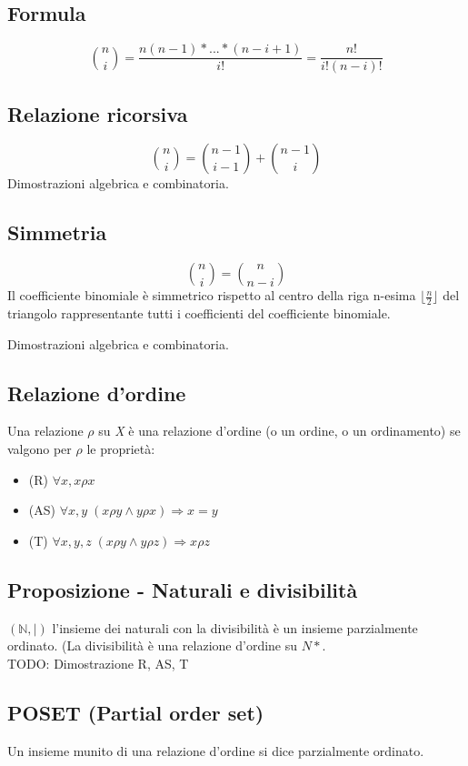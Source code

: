 \subsection{Formula} 
\[\binom{n}{i}=\frac{n(n-1)\ast ... \ast (n-i+1)}{i!} = \frac{n!}{i!(n-i)!}\]

\subsection{Relazione ricorsiva}
\[\binom{n}{i}=\binom{n-1}{i-1}+\binom{n-1}{i}\]
Dimostrazioni algebrica e combinatoria.

\subsection{Simmetria}
\[\binom{n}{i}=\binom{n}{n-i}\]
Il coefficiente binomiale è simmetrico rispetto al centro della riga n-esima \(\lfloor\frac{n}{2}\rfloor\) del triangolo rappresentante tutti i coefficienti del coefficiente binomiale.

Dimostrazioni algebrica e combinatoria.

\subsection{Relazione d'ordine}
Una relazione \(\rho\) su \textit{X} è una relazione d'ordine (o un ordine, o un ordinamento) se valgono per \(\rho\) le proprietà:
\begin{itemize}
    \item (R) \(\forall x, x\rho x\)
    \item (AS) \(\forall x,y\; (x\rho y\land y\rho x)\Rightarrow x=y\)
    \item (T) \(\forall x,y,z\; (x\rho y\land y\rho z)\Rightarrow x\rho z\)
\end{itemize}

\subsection{Proposizione - Naturali e divisibilità}
$(\mathbb{N}, |)$ l'insieme dei naturali con la divisibilità è un insieme parzialmente ordinato. (La divisibilità è una relazione d'ordine su $N*$.
\\TODO: Dimostrazione R, AS, T

\subsection{POSET (Partial order set)}
Un insieme munito di una relazione d'ordine si dice parzialmente ordinato.
